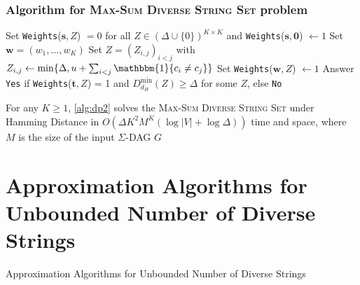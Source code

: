 \documentclass{beamer}
\begin{document}
\begin{frame}
    \frametitle{Algorithm for \textsc{Max-Sum Diverse String Set} problem}
    \begin{algorithm}[H] \label{alg:dp2}
        \footnotesize{\caption{}}
        \footnotesize{\begin{algorithmic}[1]
                \State Set \texttt{Weights}($\mathbf{s}, Z$) $=0$ for all $Z \in (\Delta \cup \{0\})^{K \times K}$ and \texttt{Weights}($\mathbf{s}, \mathbf{0}$) $\gets 1$
                \State Set $\mathbf{w} = (w_1, \dots, w_K)$
                \State Set $Z = (Z_{i,j})_{i<j}$ with $Z_{i,j} \gets \min \{\Delta, u + \sum_{i<j}\mathbbm{1}\{c_i \neq c_j\}\}$
                \State Set \texttt{Weights}($\mathbf{w}, Z$) $\gets 1$ 
                \EndFor
                \EndFor
                \EndFor
                \EndFor
                \State Answer \texttt{Yes} if \texttt{Weights}($\mathbf{t}, Z$) = 1 and $D_{d_H}^{\text{min}}(Z) \geq \Delta$ for some $Z$, else \texttt{No}
            \end{algorithmic}}
    \end{algorithm}
    \small{For any $K \geq 1$, \ref{alg:dp2} solves the \textsc{Max-Sum Diverse String Set} under Hamming Distance in $O(\Delta K^2 M^K (\log |V| + \log \Delta))$ time and space, where $M$ is the size of the input $\Sigma$-DAG $G$}
\end{frame}

\section{Approximation Algorithms for Unbounded Number of Diverse Strings}
\begin{frame}
    \begin{center}
        \huge{Approximation Algorithms for Unbounded Number of Diverse Strings}
    \end{center}
\end{frame}
\end{document}
